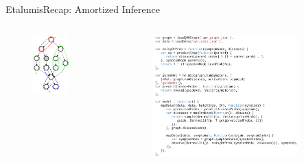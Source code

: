 \documentclass[AERbeamer%
              ,optEnglish%
              ,optBiber%
              ,optBibstyleAlphabetic%
              ,optBeamerClassicFormat%
              ]{AERlatex}%
\begin{document}
\begin{frame}[c]{Etalumis}{Recap: Amortized Inference}
    \centering
    \begin{columns}[T]
        \begin{column}{0.4\textwidth}
            \centering
            \begin{figure}
                \centering
                \includegraphics[width=0.7\textwidth]{AmortizedInferenceExampleGraph.png}
            \end{figure}
        \end{column}
        \begin{column}{0.58\textwidth}
            \centering
            \begin{figure}
                \centering
                \includegraphics[width=0.85\textwidth]{AmortizedInferenceExampleProgram.png}

\end{figure}
\end{column}
\end{columns}
\end{frame}
\end{document}
